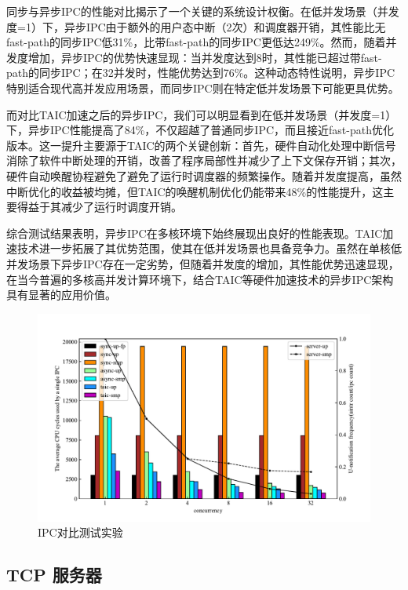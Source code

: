 同步与异步IPC的性能对比揭示了一个关键的系统设计权衡。在低并发场景（并发度=1）下，异步IPC由于额外的用户态中断（2次）和调度器开销，其性能比无fast-path的同步IPC低31\%，比带fast-path的同步IPC更低达249\%。然而，随着并发度增加，异步IPC的优势快速显现：当并发度达到8时，其性能已超过带fast-path的同步IPC；在32并发时，性能优势达到76\%。这种动态特性说明，异步IPC特别适合现代高并发应用场景，而同步IPC则在特定低并发场景下可能更具优势。

而对比TAIC加速之后的异步IPC，我们可以明显看到在低并发场景（并发度=1）下，异步IPC性能提高了84\%，不仅超越了普通同步IPC，而且接近fast-path优化版本。这一提升主要源于TAIC的两个关键创新：首先，硬件自动化处理中断信号消除了软件中断处理的开销，改善了程序局部性并减少了上下文保存开销；其次，硬件自动唤醒协程避免了避免了运行时调度器的频繁操作。随着并发度提高，虽然中断优化的收益被均摊，但TAIC的唤醒机制优化仍能带来48\%的性能提升，这主要得益于其减少了运行时调度开销。

综合测试结果表明，异步IPC在多核环境下始终展现出良好的性能表现。TAIC加速技术进一步拓展了其优势范围，使其在低并发场景也具备竞争力。虽然在单核低并发场景下异步IPC存在一定劣势，但随着并发度的增加，其性能优势迅速显现，在当今普遍的多核高并发计算环境下，结合TAIC等硬件加速技术的异步IPC架构具有显著的应用价值。


\begin{figure}[htbp]
    \centering
    \includegraphics[width=1.0\textwidth]{figures/ipc_test.pdf}
    \caption{IPC对比测试实验}\label{fig:ipc_test}
\end{figure}

\subsection{TCP 服务器}

